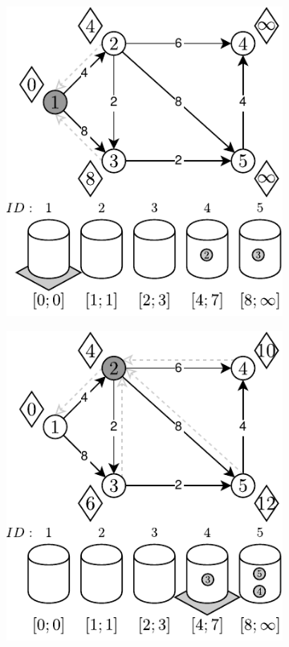 \begin{figure}[!htbp]
\begin{subfigure}[b]{0.3\textwidth}
		\includegraphics[width=\textwidth]{Chapter_II/8/b.pdf}
		\caption{}
	\end{subfigure}
	\begin{subfigure}[b]{0.3\textwidth}
		\includegraphics[width=\textwidth]{Chapter_II/8/c.pdf}

\end{subfigure}
\end{figure}
